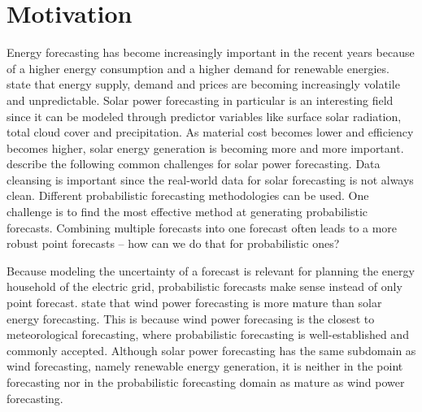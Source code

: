 \section{Motivation}
\label{sec:motivation}


Energy forecasting has become increasingly important in the recent years 
because of a higher energy consumption and a higher demand 
for renewable energies. 
\Textcite{Hong2016} state that energy supply, demand and prices are becoming increasingly 
volatile and unpredictable. 
Solar power forecasting in particular is an interesting field since it can be modeled through predictor variables 
like surface solar radiation, total cloud cover and precipitation. 
As material cost becomes lower and efficiency becomes higher, solar energy generation is becoming more and more important. 
\Textcite{Hong2016} describe the following common challenges for solar power forecasting.
Data cleansing is important since the real-world data for solar forecasting is not always clean. 
Different probabilistic forecasting methodologies can be used. One challenge is to find the most effective method at generating probabilistic forecasts. 
Combining multiple forecasts into one forecast often leads to a more robust point forecasts -- how can we do that for probabilistic ones?


Because modeling the uncertainty of a forecast is relevant for planning the energy household of the electric grid, 
probabilistic forecasts make sense instead of only point forecast. 
\Textcite{Hong2016} state that wind power forecasting is 
more mature than solar energy forecasting. This is because 
wind power forecasing is the closest to meteorological forecasting, 
where probabilistic forecasting is well-established and commonly accepted.
Although solar power forecasting has the same subdomain as wind forecasting, 
namely renewable energy generation, it is neither in the 
point forecasting nor in the probabilistic forecasting domain as mature 
as wind power forecasting. 


